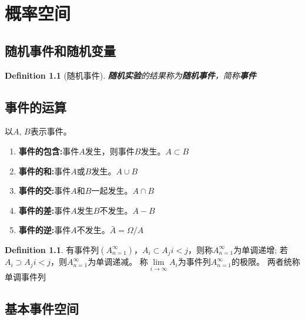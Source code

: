 \chapter{概率空间}

\section{随机事件和随机变量}
\newtheorem*{randomizedtrail}{Definition}

\begin{randomizedtrail}[随机事件]
{\bf 随机实验}的结果称为{\bf 随机事件}，简称{\bf 事件}
\end{randomizedtrail}

\section{事件的运算}
\theoremstyle{definition}
\newtheorem{monotoneeventcolumn}{Definition}[section]

\indent 以$A$, $B$表示事件。

\begin{enumerate}
\item{\bf 事件的包含:}\quad 事件$A$发生，则事件$B$发生。\equalwith$A\subset B$
\item{\bf 事件的和:}\quad 事件$A$或$B$发生。\equalwith$A\cup B$
\item{\bf 事件的交:}\quad 事件$A$和$B$一起发生。\equalwith$A\cap B$
\item{\bf 事件的差:}\quad 事件$A$发生$B$不发生。\equalwith$A - B$
\item{\bf 事件的逆:}\quad 事件$A$不发生。\equalwith${\bar A} = \Omega/A$
\end{enumerate}

\begin{monotoneeventcolumn}
    有事件列$(A_{n=1}^{\infty})$，$A_i\subset A_j$\equalwith$i<j$，则称$A_{n=1}^{\infty}$为单调递增; 若%
    $A_i\supset A_j$\equalwith$i<j$，则$A_{n=1}^{\infty}$为单调递减。%
    称$\lim\limits_{i\to\infty}A_i$为事件列$A_{n=1}^{\infty}$的极限。%
    两者统称单调事件列
\end{monotoneeventcolumn}

\section{基本事件空间}
\newtheorem{basicevent}{Definition}[section]
\newtheorem{basiceventspace}[basicevent]{Definition}

